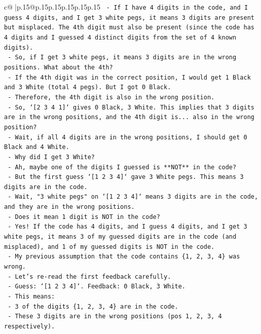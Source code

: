\documentclass{article}
\begin{document}
{\begin{supertabular}{c@{$\;$}|p{.15\linewidth}@{}p{.15\linewidth}p{.15\linewidth}p{.15\linewidth}p{.15\linewidth}p{.15\linewidth}}
{{{\texttt{  {-} If I have 4 digits in the code, and I guess 4 digits, and I get 3 white pegs, it means 3 digits are present but misplaced. The 4th digit must also be present (since the code has 4 digits and I guessed 4 distinct digits from the set of 4 known digits).} \\
\texttt{  {-} So, if I get 3 white pegs, it means 3 digits are in the wrong positions. What about the 4th?} \\
\texttt{  {-} If the 4th digit was in the correct position, I would get 1 Black and 3 White (total 4 pegs). But I got 0 Black.} \\
\texttt{  {-} Therefore, the 4th digit is also in the wrong position.} \\
\texttt{  {-} So, `{[}2 3 4 1{]}` gives 0 Black, 3 White. This implies that 3 digits are in the wrong positions, and the 4th digit is... also in the wrong position?} \\
\texttt{  {-} Wait, if all 4 digits are in the wrong positions, I should get 0 Black and 4 White.} \\
\texttt{  {-} Why did I get 3 White?} \\
\texttt{  {-} Ah, maybe one of the digits I guessed is **NOT** in the code?} \\
\texttt{  {-} But the first guess `{[}1 2 3 4{]}` gave 3 White pegs. This means 3 digits are in the code.} \\
\texttt{  {-} Wait, "3 white pegs" on `{[}1 2 3 4{]}` means 3 digits are in the code, and they are in the wrong positions.} \\
\texttt{  {-} Does it mean 1 digit is NOT in the code?} \\
\texttt{  {-} Yes! If the code has 4 digits, and I guess 4 digits, and I get 3 white pegs, it means 3 of my guessed digits are in the code (and misplaced), and 1 of my guessed digits is NOT in the code.} \\
\texttt{  {-} My previous assumption that the code contains \{1, 2, 3, 4\} was wrong.} \\
\texttt{  {-} Let's re{-}read the first feedback carefully.} \\
\texttt{  {-} Guess: `{[}1 2 3 4{]}`. Feedback: 0 Black, 3 White.} \\
\texttt{  {-} This means:} \\
\texttt{    {-} 3 of the digits \{1, 2, 3, 4\} are in the code.} \\
\texttt{    {-} These 3 digits are in the wrong positions (pos 1, 2, 3, 4 respectively).} \\
}}}
\end{supertabular}}
\end{document}
